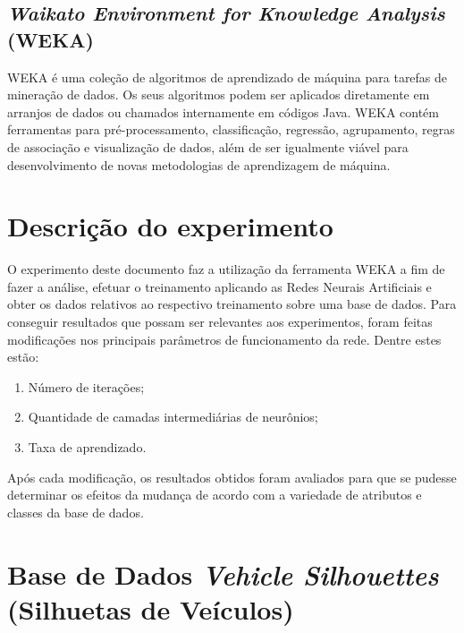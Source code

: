 \documentclass[
	article,			%
	11pt,				%
	oneside,			%
	a4paper,			%
	english,			%
	brazil,				%
	sumario=tradicional
	]{abntex2}
\begin{document}
\subsection{\textit{Waikato Environment for Knowledge Analysis} (WEKA)}

WEKA é uma coleção de algoritmos de aprendizado de máquina para tarefas de mineração de dados. Os seus algoritmos podem ser aplicados diretamente em arranjos de dados ou chamados  internamente em códigos Java. WEKA contém ferramentas para pré-processamento, classificação, regressão, agrupamento, regras de associação e visualização de dados, além de ser igualmente viável para desenvolvimento de novas metodologias de aprendizagem de máquina.

\section{Descrição do experimento}

O experimento deste documento faz a utilização da ferramenta WEKA a fim de fazer a análise, efetuar o treinamento aplicando as Redes Neurais Artificiais e obter os dados relativos ao respectivo treinamento sobre uma base de dados. Para conseguir resultados que possam ser relevantes aos experimentos, foram feitas modificações nos principais parâmetros de funcionamento da rede. Dentre estes estão:

\begin{enumerate}
	\item Número de iterações;
	\item Quantidade de camadas intermediárias de neurônios;
	\item Taxa de aprendizado.
\end{enumerate}

Após cada modificação, os resultados obtidos foram avaliados para que se pudesse determinar os efeitos da mudança de acordo com a variedade de atributos e classes da base de dados.

\section{Base de Dados \textit{Vehicle Silhouettes} (Silhuetas de Veículos)}
\end{document}
